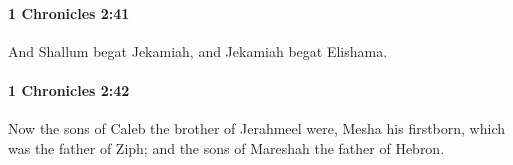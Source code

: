		\paragraph{1 Chronicles 2:41} %
			\label{1CHRONICLES-2-41}

			And Shallum begat Jekamiah, and Jekamiah begat Elishama.


		\paragraph{1 Chronicles 2:42} %
			\label{1CHRONICLES-2-42}

			Now the sons of Caleb the brother of Jerahmeel were, Mesha his firstborn, which was the father of Ziph; and the sons of Mareshah the father of Hebron.


